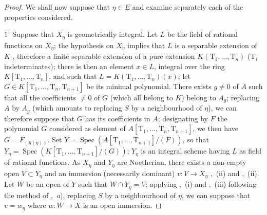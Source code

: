 \begin{proof}
We shall now suppose that $\eta\in E$ and examine separately each of the properties considered.

$1^\circ$ Suppose that $X_\eta$ is geometrically integral.
Let $L$ be the field of rational functions on $X_\eta$; the hypothesis on $X_\eta$ implies that $L$ is a separable extension of $K$ , therefore a finite separable extension of a pure extension $K(\mathrm{T}_1,\ldots,\mathrm{T}_n)$ ($\mathrm{T}_i$ indeterminates); there is then an element $x\in L$, integral over the ring $K[\mathrm{T}_1,\ldots,\mathrm{T}_n]$, and such that $L=K(\mathrm{T}_1,\ldots,\mathrm{T}_n)(x)$; let $G\in K[\mathrm{T}_1,\ldots,\mathrm{T}_n,\mathrm{T}_{n+1}]$ be its minimal polynomial.
There exists $g\neq 0$ of $A$ such that all the coefficients $\neq 0$ of $G$ (which all belong to $K$) belong to $A_g$; replacing $A$ by $A_g$ (which amounts to replacing $S$ by a neighbourhood of $\eta$), we can therefore suppose that $G$ has its coefficients in $A$; designating by $F$ the polynomial $G$ considered as element of $A[\mathrm{T}_1,\ldots,\mathrm{T}_n,\mathrm{T}_{n+1}]$, we then have $G=F_{(\boldsymbol{k}(\eta))}$.
Set $Y=\operatorname{Spec}(A[\mathrm{T}_1,\ldots,\mathrm{T}_{n+1}]/(F))$, so that $Y_\eta=\operatorname{Spec}(K[\mathrm{T}_1,\ldots,\mathrm{T}_{n+1}]/(G))$; $Y_\eta$ is an integral scheme having $L$ as field of rational functions.
As $X_\eta$ and $Y_\eta$ are Noetherian, there exists a non-empty open $V\subset Y_\eta$ and an immersion (necessarily dominant) $v:V\to X_\eta$ ,~(ii) and ,~(ii).
Let $W$ be an open of $Y$ such that $W\cap Y_\eta=V$; applying ,~(i) and ,~(iii) following the method of ,~\emph{a}), replacing $S$ by a neighbourhood of $\eta$, we can suppose that $v=w_\eta$ where $w:W\to X$ is an open immersion.


\end{proof}
